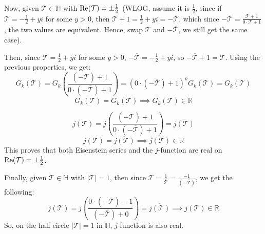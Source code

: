 \documentclass{article}
\begin{document}
\hfil

Now, given $\mathcal{T}\in\mathbb{H}$ with $\textmd{Re}(\mathcal{T})=\pm\frac{1}{2}$ (WLOG, assume it is $\frac{1}{2}$, since if $\mathcal{T}=-\frac{1}{2}+yi$ for some $y>0$, then $\mathcal{T}+1 = \frac{1}{2}+yi = -\overline{\mathcal{T}}$, which since $-\overline{\mathcal{T}}=\frac{\mathcal{T}+1}{0\cdot\mathcal{T}+1}$, the two values are equivalent. Hence, swap $\mathcal{T}$ and $-\overline{\mathcal{T}}$, we still get the same case).

Then, since $\mathcal{T}=\frac{1}{2}+yi$ for some $y>0$, $-\overline{\mathcal{T}} = -\frac{1}{2}+yi$, so $-\overline{\mathcal{T}}+1 = \mathcal{T}$. Using the previous properties, we get:
$$G_k(\mathcal{T})=G_k\left(\frac{(-\overline{\mathcal{T}})+1}{0\cdot(-\overline{\mathcal{T}})+1}\right) = (0\cdot(-\overline{\mathcal{T}})+1)^k\overline{G_k(\mathcal{T})} = \overline{G_k(\mathcal{T})}$$
$$G_k(\mathcal{T})=\overline{G_k(\mathcal{T})}\implies G_k(\mathcal{T})\in \mathbb{R}$$

$$j(\mathcal{T})=j\left(\frac{(-\overline{\mathcal{T}})+1}{0\cdot(-\overline{\mathcal{T}})+1}\right) = \overline{j(\mathcal{T})}$$
$$j(\mathcal{T})=\overline{j(\mathcal{T})}\implies j(\mathcal{T})\in\mathbb{R}$$
This proves that both Eisenstein series and the $j$-function are real on $\textmd{Re}(\mathcal{T})=\pm\frac{1}{2}$.

Finally, given $\mathcal{T}\in\mathbb{H}$ with $|\mathcal{T}|=1$, then since $\mathcal{T}=\frac{1}{\overline{\mathcal{T}}}=\frac{-1}{(-\overline{\mathcal{T}})}$, we get the following:
$$j(\mathcal{T})=j\left(\frac{0\cdot(-\overline{\mathcal{T}})-1}{(-\overline{\mathcal{T}})+0}\right) = \overline{j(\mathcal{T})} \implies j(\mathcal{T})\in\mathbb{R}$$
So, on the half circle $|\mathcal{T}|=1$ in $\mathbb{H}$, $j$-function is also real.
\end{document}
